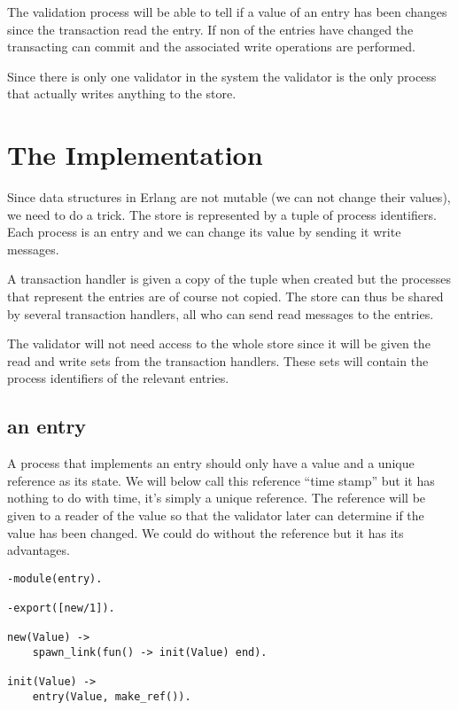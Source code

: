 \documentclass[a4paper, 11pt]{article}
\begin{document}
The validation process will be able to tell if a value of an entry
has been changes since the transaction read the entry. If non of the
entries have changed the transacting can commit and the associated
write operations are performed. 

Since there is only one validator in the system the validator is the
only process that actually writes anything to the store.

\section{The Implementation}

Since data structures in Erlang are not mutable (we can not change
their values), we need to do a trick. The store is represented by a
tuple of process identifiers. Each process is an entry and
we can change its value by sending it write messages. 

A transaction handler is given a copy of the tuple when created but
the processes that represent the entries are of course not copied. The
store can thus be shared by several transaction handlers, all who can
send read messages to the entries.

The validator will not need access to the whole store since it will be
given the read and write sets from the transaction handlers. These sets
will contain the process identifiers of the relevant entries.

\subsection{an entry}

A process that implements an entry should only have a value and a
unique reference as its state. We will below call this reference
``time stamp'' but it has nothing to do with time, it's simply a unique
reference. The reference will be given to a reader of the value so
that the validator later can determine if the value has been
changed. We could do without the reference but it has its advantages.

\begin{verbatim}
-module(entry).

-export([new/1]).

new(Value) ->
    spawn_link(fun() -> init(Value) end).

init(Value) ->
    entry(Value, make_ref()).

\end{verbatim}
\end{document}
